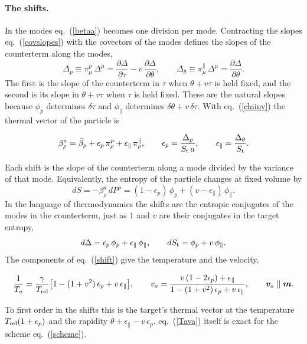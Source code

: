\documentclass[11pt,aps,preprint,nofootinbib,superscriptaddress,tightenlines]{revtex4-2}
\def\st{\begin{equation}}
\def\stp{\end{equation}}
\def\Eq#1{eq.~(\ref{#1})}
\let\oldparagraph\paragraph
\renewcommand{\paragraph}{\par\bigskip\oldparagraph}
\begin{document}
\paragraph{The shifts.}  In the modes \Eq{betaa} becomes one division per mode.  Contracting the slopes \Eq{covslopes} with the covectors of the modes
defines the slopes of the counterterm along the modes,
\st
\Delta_p\equiv\pi^p_\mu\,\Delta^\mu=\frac{\partial\Delta}{\partial\tau}-v\,\frac{\partial\Delta}{\partial\theta},\qquad
\Delta_\theta\equiv\pi^\parallel_\mu\,\Delta^\mu=\frac{\partial\Delta}{\partial\theta} .
\label{slopes}
\stp
The first is the slope of the counterterm in $\tau$ when $\theta+v\tau$ is held fixed, and the second is its slope in $\theta+v\tau$ when $\tau$ is held
fixed.  These are the natural slopes because $\phi_p$ determines $\delta\tau$ and $\phi_\parallel$ determines $\delta\theta+v\,\delta\tau$.  With \Eq{chiinv} the
thermal vector of the particle is
\begin{keyeq}
\st
\beta^a_\rho=\bar\beta_\rho+\epsilon_p\,\pi^p_\rho+\epsilon_\parallel\,\pi^\parallel_\rho,\qquad
\epsilon_p=\frac{\Delta_p}{S_{\rm t}\,a},\qquad \epsilon_\parallel=\frac{\Delta_\theta}{S_{\rm t}} .
\label{shift}
\stp
\end{keyeq}
Each shift is the slope of the counterterm along a mode divided by the variance of that mode.  Equivalently, the entropy of the particle changes at
fixed volume by
\st
dS=-\beta^a_\rho\,dP^\rho=(1-\epsilon_p)\,\phi_p+(v-\epsilon_\parallel)\,\phi_\parallel .
\stp
In the language of thermodynamics the shifts are the entropic conjugates of the modes in the counterterm, just as $1$ and $v$ are their conjugates
in the target entropy,
\st
d\Delta=\epsilon_p\,\phi_p+\epsilon_\parallel\,\phi_\parallel,\qquad dS_{\rm t}=\phi_p+v\,\phi_\parallel .
\stp
The components of \Eq{shift} give the temperature and the velocity,
\begin{keyeq}
\st
\frac1{T_a}=\frac{\gamma}{T_{\rm rel}}\big[1-(1+v^2)\,\epsilon_p+v\,\epsilon_\parallel\big],\qquad
v_a=\frac{v\,(1-2\epsilon_p)+\epsilon_\parallel}{1-(1+v^2)\,\epsilon_p+v\,\epsilon_\parallel},\qquad \bm v_a\parallel\bm m .
\label{Tava}
\stp
\end{keyeq}
To first order in the shifts this is the target's thermal vector at the temperature $T_{\rm rel}(1+\epsilon_p)$ and the rapidity
$\theta+\epsilon_\parallel-v\,\epsilon_p$.  \Eq{Tava} itself is exact for the scheme \Eq{scheme}.
\end{document}
